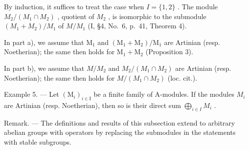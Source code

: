 By induction, it suffices to treat the case when \(I = \{1, 2\}\) . The module \(M_{2}/(M_{1} \cap M_{2})\) , quotient of \(M_{2}\) , is isomorphic to the submodule \((M_{1} + M_{2})/M_{1}\) of \(M/M_{1}\) (I, §4, No.~6, p.~41, Theorem 4).

In part a), we assume that \(\mathrm{M}_1\) and \((\mathrm{M}_1 + \mathrm{M}_2) / \mathrm{M}_1\) are Artinian (resp. Noetherian); the same then holds for \(\mathrm{M}_1 + \mathrm{M}_2\) (Proposition 3).

In part b), we assume that \(M/M_{2}\) and \(M_{2}/(M_{1} \cap M_{2})\) are Artinian (resp. Noetherian); the same then holds for \(M/(M_{1} \cap M_{2})\) (loc. cit.).

Example 5. --- Let \((\mathrm{M}_{i})_{i\in\mathrm{I}}\) be a finite family of A-modules. If the modules \(M_{i}\) are Artinian (resp. Noetherian), then so is their direct sum \(\bigoplus_{i\in I} M_{i}\) .

Remark. --- The definitions and results of this subsection extend to arbitrary abelian groups with operators by replacing the submodules in the statements with stable subgroups.

